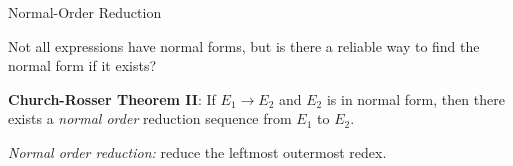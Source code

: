 \documentclass{plt}
\begin{document}
\begin{frame}{Normal-Order Reduction}

Not all expressions have normal forms, but is there a reliable way to
find the normal form if it exists?

\vspace{2pc}

\shadowstart
\begin{minipage}{1\textwidth}
\textbf{Church-Rosser Theorem II}:  If $E_1 \rightarrow E_2$ and $E_2$
is in normal form, then there exists a \emph{normal order} reduction
sequence from $E_1$ to $E_2$.
\end{minipage}
\shadowend

\emph{Normal order reduction:} reduce the leftmost outermost redex.

\end{frame}
\end{document}
